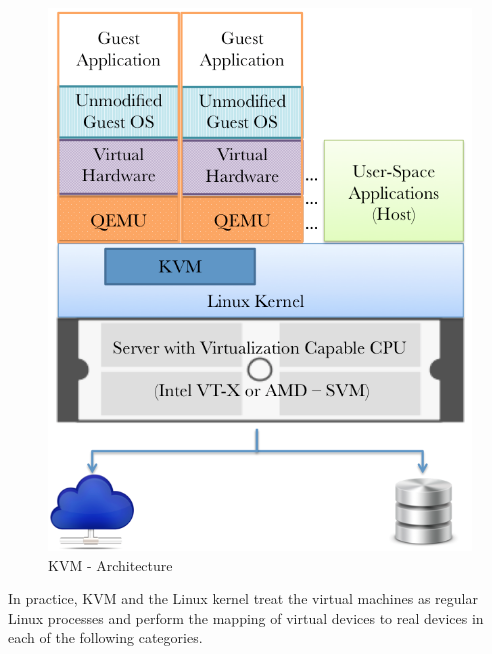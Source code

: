 \begin{figure}[htbp]
\centering
\includegraphics[width=120mm]{kvm-arch.png}
\caption{KVM - Architecture}
\label{img_kvm_arch}
\end{figure}

In practice, KVM and the Linux kernel treat the virtual machines as regular Linux processes and perform the mapping of virtual devices to real devices in each of the following categories.

